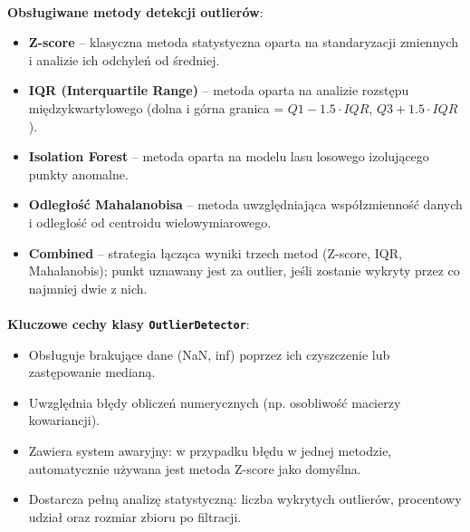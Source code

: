 \documentclass{classrep}
\begin{document}
\paragraph{}
\textbf{Obsługiwane metody detekcji outlierów}:
\begin{itemize}
	\item \textbf{Z-score} – klasyczna metoda statystyczna oparta na standaryzacji zmiennych i analizie ich odchyleń od średniej.
	\item \textbf{IQR (Interquartile Range)} – metoda oparta na analizie rozstępu międzykwartylowego (dolna i górna granica = $Q1 - 1.5 \cdot IQR$, $Q3 + 1.5 \cdot IQR$).
	\item \textbf{Isolation Forest} – metoda oparta na modelu lasu losowego izolującego punkty anomalne.
	\item \textbf{Odległość Mahalanobisa} – metoda uwzględniająca współzmienność danych i odległość od centroidu wielowymiarowego.
	\item \textbf{Combined} – strategia łącząca wyniki trzech metod (Z-score, IQR, Mahalanobis); punkt uznawany jest za outlier, jeśli zostanie wykryty przez co najmniej dwie z nich.
\end{itemize}

\paragraph{}
\textbf{Kluczowe cechy klasy \texttt{OutlierDetector}}:
\begin{itemize}
	\item Obsługuje brakujące dane (NaN, inf) poprzez ich czyszczenie lub zastępowanie medianą.
	\item Uwzględnia błędy obliczeń numerycznych (np. osobliwość macierzy kowariancji).
	\item Zawiera system awaryjny: w przypadku błędu w jednej metodzie, automatycznie używana jest metoda Z-score jako domyślna.
	\item Dostarcza pełną analizę statystyczną: liczba wykrytych outlierów, procentowy udział oraz rozmiar zbioru po filtracji.
\end{itemize}
\end{document}
